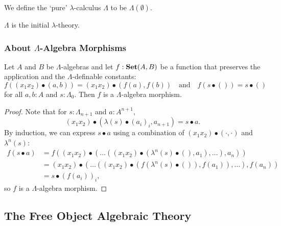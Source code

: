 \begin{definition}\label{def:pure-lambda-calculus}
  We define the `pure' $ \lambda $-calculus $ \Lambda $ to be $ \Lambda(\emptyset) $.
\end{definition}

\begin{corollary}
  $ \Lambda $ is the initial $ \lambda $-theory.
\end{corollary}

\subsubsection{About $ \Lambda $-Algebra Morphisms}

\begin{lemma}\label{lem:make-is-lambda-algebra-morphism}
  Let $ A $ and $ B $ be $ \Lambda $-algebras and let $ f: \mathbf{Set}(A, B) $ be a function that preserves the application and the $ \Lambda $-definable constants:
  \[ f((x_1 x_2) \bullet (a, b)) = (x_1 x_2) \bullet (f(a), f(b)) \quad \text{and} \quad f(s \bullet ()) = s \bullet () \]
  for all $ a, b: A $ and $ s: \Lambda_0 $. Then $ f $ is a $ \Lambda $-algebra morphism.
\end{lemma}
\begin{proof}
  Note that for $ s: \Lambda_{n + 1} $ and $ a: A^{n + 1} $,
  \[ (x_1 x_2) \bullet (\lambda(s) \bullet (a_i)_i, a_{n + 1}) = s \bullet a. \]
  By induction, we can express $ s \bullet a $ using a combination of $ (x_1 x_2) \bullet (\cdot, \cdot) $ and $ \lambda^n(s) $:
  \begin{align*}
    f(s \bullet a) &= f((x_1 x_2) \bullet (\dots ((x_1 x_2) \bullet (\lambda^n(s) \bullet (), a_1), \dots), a_n))\\
    &= (x_1 x_2) \bullet (\dots ((x_1 x_2) \bullet (f(\lambda^n(s) \bullet ()), f(a_1)), \dots), f(a_n))\\
    &= s \bullet (f(a_i))_i,
  \end{align*}
  so $ f $ is a $ \Lambda $-algebra morphism.
\end{proof}

\subsection{The Free Object Algebraic Theory}

